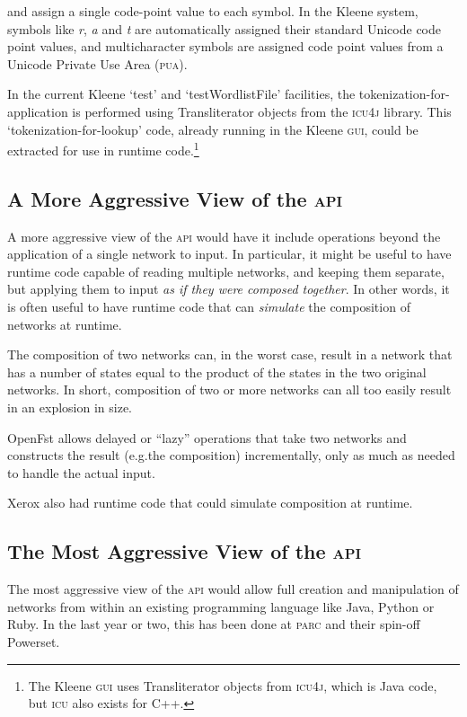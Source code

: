 \documentclass[letterpaper,12pt]{article}
\providecommand{\acro}{}\renewcommand{\acro}{\textsc}
\begin{document}
\noindent
and assign a single code-point value to each symbol.
In the Kleene system, symbols like \emph{r}, \emph{a} and \emph{t} are
automatically assigned their standard Unicode code point values, and multicharacter symbols are
assigned code point values from a Unicode Private Use Area (\acro{pua}). 

In the current Kleene `test' and `testWordlistFile' facilities, the tokenization-for-application is
performed using Transliterator objects from the \acro{icu4j}
library.  This `tokenization-for-lookup' code, already running in
the Kleene \acro{gui}, could be extracted for use in runtime
code.\footnote{The Kleene \acro{gui} uses Transliterator objects
from \acro{icu4j}, which is Java code, but \acro{icu} also exists
for C++.}

\subsection{A More Aggressive View of the \acro{api}}

A more aggressive view of the \acro{api} would have it include
operations beyond the application of a single network to input.  In
particular, it might be useful to have runtime code capable of
reading multiple networks, and keeping them separate, but applying
them to input \emph{as if they were composed together}.  In other
words, it is often useful to have runtime code that can
\emph{simulate} the composition of networks at runtime.

The composition of two networks can, in the worst case, result in a
network that has a number of states equal to the product of the
states in the two original networks.  In short, composition of two
or more networks can all too easily result in an explosion in size.

OpenFst allows delayed or ``lazy'' operations that take two networks
and constructs the result (e.g.\@ the composition) incrementally,
only as much as needed to handle the actual input.

Xerox also had runtime code that could simulate composition at
runtime.

\subsection{The Most Aggressive View of the \acro{api}}

The most aggressive view of the \acro{api} would allow full creation
and manipulation of networks from within an existing programming
language like Java, Python or Ruby.  In the last year or two, this
has been done at \acro{parc} and their spin-off Powerset.  
\end{document}

